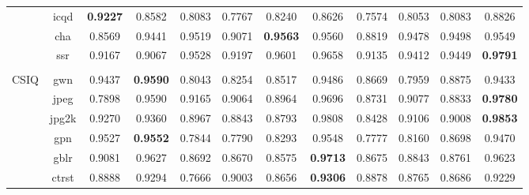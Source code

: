 \documentclass[11pt,a4paper]{article}
\begin{document}
\begin{table}[!htb]
\begin{scriptsize}
\begin{threeparttable}
\begin{tabular}{*{12}{c}}
& icqd & \textbf{0.9227} & 0.8582 & \cellcolor{green!25}0.8083 & \cellcolor{green!25}0.7767 & 0.8240 & 0.8626 & \cellcolor{green!25}0.7574 & \cellcolor{green!25}0.8053 & \cellcolor{green!25}0.8083 & 0.8826\\
& cha & \cellcolor{green!25}0.8569 & 0.9441 & 0.9519 & \cellcolor{green!25}0.9071 & \textbf{0.9563} & 0.9560 & \cellcolor{green!25}0.8819 & 0.9478 & 0.9498 & 0.9549\\
& ssr & \cellcolor{green!25}0.9167 & \cellcolor{green!25}0.9067 & \cellcolor{green!25}0.9528 & \cellcolor{green!25}0.9197 & \cellcolor{green!25}0.9601 & 0.9658 & \cellcolor{green!25}0.9135 & \cellcolor{green!25}0.9412 & \cellcolor{green!25}0.9449 & \textbf{0.9791}\\
\\
\multirow{6}{*}{CSIQ} & gwn & 0.9437 & \textbf{0.9590} & \cellcolor{green!25}0.8043 & \cellcolor{green!25}0.8254 & \cellcolor{green!25}0.8517 & 0.9486 & \cellcolor{green!25}0.8669 & \cellcolor{green!25}0.7959 & \cellcolor{green!25}0.8875 & 0.9433\\
& jpeg & \cellcolor{green!25}0.7898 & \cellcolor{green!25}0.9590 & \cellcolor{green!25}0.9165 & \cellcolor{green!25}0.9064 & \cellcolor{green!25}0.8964 & 0.9696 & \cellcolor{green!25}0.8731 & \cellcolor{green!25}0.9077 & \cellcolor{green!25}0.8833 & \textbf{0.9780}\\
& jpg2k & \cellcolor{green!25}0.9270 & \cellcolor{green!25}0.9360 & \cellcolor{green!25}0.8967 & \cellcolor{green!25}0.8843 & \cellcolor{green!25}0.8793 & 0.9808 & \cellcolor{green!25}0.8428 & \cellcolor{green!25}0.9106 & \cellcolor{green!25}0.9008 & \textbf{0.9853}\\
& gpn & 0.9527 & \textbf{0.9552} & \cellcolor{green!25}0.7844 & \cellcolor{green!25}0.7790 & \cellcolor{green!25}0.8293 & 0.9548 & \cellcolor{green!25}0.7777 & \cellcolor{green!25}0.8160 & \cellcolor{green!25}0.8698 & 0.9470\\
& gblr & \cellcolor{green!25}0.9081 & 0.9627 & \cellcolor{green!25}0.8692 & \cellcolor{green!25}0.8670 & \cellcolor{green!25}0.8575 & \textbf{0.9713} & \cellcolor{green!25}0.8675 & \cellcolor{green!25}0.8843 & \cellcolor{green!25}0.8761 & 0.9623\\
& ctrst & 0.8888 & 0.9294 & \cellcolor{green!25}0.7666 & 0.9003 & \cellcolor{green!25}0.8656 & \textbf{0.9306} & 0.8878 & 0.8765 & \cellcolor{green!25}0.8686 & 0.9229\\\midrule[0.5mm]
\end{tabular}
\begin{tablenotes}

\end{tablenotes}
\end{threeparttable}
\end{scriptsize}
\end{table}
\end{document}
